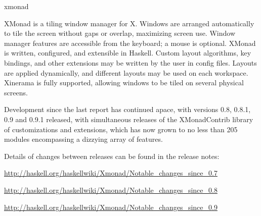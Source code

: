 \begin{hcarentry}{xmonad}
\label{xmonad}
\makeheader

XMonad is a tiling window manager for X. Windows are arranged
automatically to tile the screen without gaps or overlap, maximizing
screen use. Window manager features are accessible from the keyboard; a
mouse is optional. XMonad is written, configured, and extensible in
Haskell. Custom layout algorithms, key bindings, and other extensions may
be written by the user in config files. Layouts are applied
dynamically, and different layouts may be used on each workspace.
Xinerama is fully supported, allowing windows to be tiled on several
physical screens.

Development since the last report has continued apace, with versions
0.8, 0.8.1, 0.9 and 0.9.1 released, with simultaneous releases of the
XMonadContrib library of customizations and extensions, which has now
grown to no less than 205 modules encompassing a dizzying array of features.

Details of changes between releases can be found in the release notes:

\item \url{http://haskell.org/haskellwiki/Xmonad/Notable_changes_since_0.7}
\item \url{http://haskell.org/haskellwiki/Xmonad/Notable_changes_since_0.8}
\item \url{http://haskell.org/haskellwiki/Xmonad/Notable_changes_since_0.9}



\end{hcarentry}

